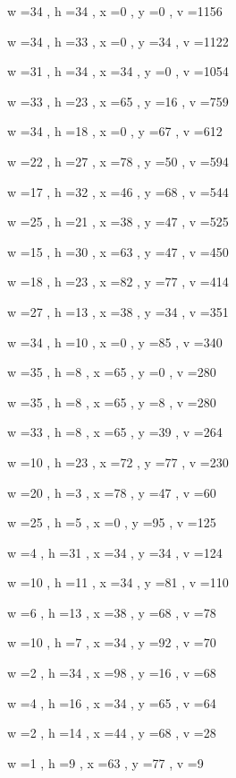\documentclass[11pt]{article}
\begin{document}
w =34 , h =34 , x =0 , y =0 , v =1156
\par
w =34 , h =33 , x =0 , y =34 , v =1122
\par
w =31 , h =34 , x =34 , y =0 , v =1054
\par
w =33 , h =23 , x =65 , y =16 , v =759
\par
w =34 , h =18 , x =0 , y =67 , v =612
\par
w =22 , h =27 , x =78 , y =50 , v =594
\par
w =17 , h =32 , x =46 , y =68 , v =544
\par
w =25 , h =21 , x =38 , y =47 , v =525
\par
w =15 , h =30 , x =63 , y =47 , v =450
\par
w =18 , h =23 , x =82 , y =77 , v =414
\par
w =27 , h =13 , x =38 , y =34 , v =351
\par
w =34 , h =10 , x =0 , y =85 , v =340
\par
w =35 , h =8 , x =65 , y =0 , v =280
\par
w =35 , h =8 , x =65 , y =8 , v =280
\par
w =33 , h =8 , x =65 , y =39 , v =264
\par
w =10 , h =23 , x =72 , y =77 , v =230
\par
w =20 , h =3 , x =78 , y =47 , v =60
\par
w =25 , h =5 , x =0 , y =95 , v =125
\par
w =4 , h =31 , x =34 , y =34 , v =124
\par
w =10 , h =11 , x =34 , y =81 , v =110
\par
w =6 , h =13 , x =38 , y =68 , v =78
\par
w =10 , h =7 , x =34 , y =92 , v =70
\par
w =2 , h =34 , x =98 , y =16 , v =68
\par
w =4 , h =16 , x =34 , y =65 , v =64
\par
w =2 , h =14 , x =44 , y =68 , v =28
\par
w =1 , h =9 , x =63 , y =77 , v =9
\par
\newpage
\end{document}
